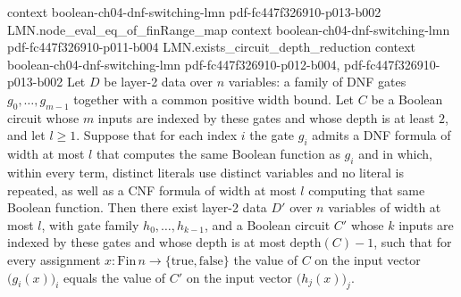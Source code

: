 \begin{lemma}
  {context}
  {boolean-ch04-dnf-switching-lmn}
  {pdf-fc447f326910-p013-b002}
\proofstep
  {LMN.node_eval_eq_of_finRange_map}
  {context}
  {boolean-ch04-dnf-switching-lmn}
  {pdf-fc447f326910-p011-b004}
\proofstep
  {LMN.exists_circuit_depth_reduction}
  {context}
  {boolean-ch04-dnf-switching-lmn}
  {pdf-fc447f326910-p012-b004,
    pdf-fc447f326910-p013-b002}
Let $D$ be layer-2 data over $n$ variables: a family of DNF gates $g_0,\dots,g_{m-1}$
together with a common positive width bound. Let $C$ be a Boolean circuit whose $m$
inputs are indexed by these gates and whose depth is at least $2$, and let $l\ge 1$.
Suppose that for each index $i$ the gate $g_i$ admits a DNF formula of width at most $l$
that computes the same Boolean function as $g_i$ and in which, within every term,
distinct literals use distinct variables and no literal is repeated, as well as a CNF
formula of width at most $l$ computing that same Boolean function. Then there exist
layer-2 data $D'$ over $n$ variables of width at most $l$, with gate family
$h_0,\dots,h_{k-1}$, and a Boolean circuit $C'$ whose $k$ inputs are indexed by these
gates and whose depth is at most $\mathrm{depth}(C)-1$, such that for every assignment
$x\colon\mathrm{Fin}\,n\to\{\mathrm{true},\mathrm{false}\}$ the value of $C$ on the
input vector $\bigl(g_i(x)\bigr)_i$ equals the value of $C'$ on the input vector
$\bigl(h_j(x)\bigr)_j$.
\end{lemma}

